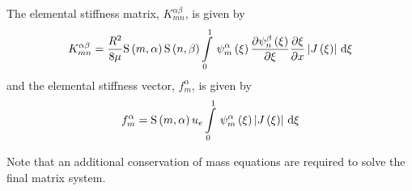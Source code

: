 The elemental stiffness matrix, $K^{\alpha\beta}_{mn}$, is given by
\begin{equation}
  K^{\alpha\beta}_{mn}=\frac{R^{2}}{8\mu}\gsf{m}{\alpha}\gsf{n}{\beta}
  \gint{0}{1}{\gbfn{m}{\alpha}{\xi}\delby{\gbfn{n}{\beta}{\xi}}{\xi}\delby{\xi}{x}
    \abs{\fnof{J}{\xi}}}{\xi}
  \label{eqn:elementalfemlhs1}
\end{equation}
and the elemental stiffness vector, $f^{\alpha}_{m}$, is given by
\begin{equation}
  f^{\alpha}_{m}=\gsf{m}{\alpha}\elementdof{u}{e}\gint{0}{1}{\gbfn{m}{\alpha}{\xi}
    \abs{\fnof{J}{\xi}}}{\xi}
  \label{eqn:elementalfemlhs2}
\end{equation}

Note that an additional conservation of mass equations are required to solve
the final matrix system.
